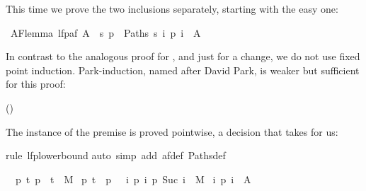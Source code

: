 \begin{isabellebody}
\begin{isamarkuptext}
This time we prove the two inclusions separately, starting
with the easy one:%
\end{isamarkuptext}%
\isamarkuptrue%
\isamarkupfalse%
\ AF{\isacharunderscore}lemma{}{\isacharcolon}\ {\isachardoublequoteopen}lfp{\isacharparenleft}af\ A{\isacharparenright}\ {\isasymsubseteq}\ {\isacharbraceleft}s{\isachardot}\ {\isasymforall}p\ {\isasymin}\ Paths\ s{\isachardot}\ {\isasymexists}i{\isachardot}\ p\ i\ {\isasymin}\ A{\isacharbraceright}{\isachardoublequoteclose}%
\isadelimproof
%
\endisadelimproof
%
\isatagproof
%
\begin{isamarkuptxt}%
\noindent
In contrast to the analogous proof for , and just
for a change, we do not use fixed point induction.  Park-induction,
named after David Park, is weaker but sufficient for this proof:
\begin{center}
 \hfill ()
\end{center}
The instance of the premise  is proved pointwise,
a decision that  takes for us:%
\end{isamarkuptxt}%
\isamarkuptrue%
\isamarkupfalse%
{\isacharparenleft}rule\ lfp{\isacharunderscore}lowerbound{\isacharparenright}\isanewline
{}\isamarkupfalse%
{\isacharparenleft}auto\ simp\ add{\isacharcolon}\ af{\isacharunderscore}def\ Paths{\isacharunderscore}def{\isacharparenright}%
\begin{isamarkuptxt}%
\begin{isabelle}%
\ {}{\isachardot}\ {\isasymAnd}p{\isachardot}\ {\isasymlbrakk}{\isasymforall}t{\isachardot}\ {\isacharparenleft}p\ {}{\isacharcomma}\ t{\isacharparenright}\ {\isasymin}\ M\ {\isasymlongrightarrow}\isanewline
{}p{\isachardot}\ t\ {\isacharequal}\ p\ {}\ {\isasymand}\ {\isacharparenleft}{\isasymforall}i{\isachardot}\ {\isacharparenleft}p\ i{\isacharcomma}\ p\ {\isacharparenleft}Suc\ i{\isacharparenright}{\isacharparenright}\ {\isasymin}\ M{\isacharparenright}\ {\isasymlongrightarrow}\isanewline
{}i{\isachardot}\ p\ i\ {\isasymin}\ A{\isacharparenright}{\isacharparenright}{\isacharsemicolon}\isanewline

\end{isabelle}
\end{isamarkuptxt}
\end{isabellebody}
